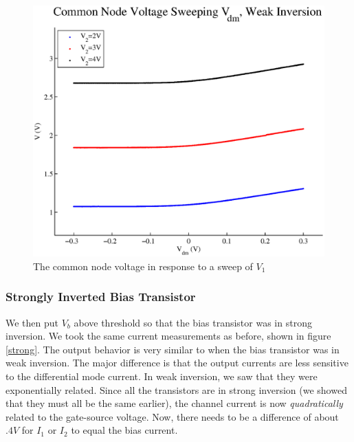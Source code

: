 \documentclass{article}
\begin{document}
\begin{figure}[H]
\centering
\includegraphics[scale=.7]{plot_weak_v.eps}
\caption{The common node voltage in response to a sweep of $V_1$}
\label{weakV}
\end{figure}

\subsubsection*{Strongly Inverted Bias Transistor}

We then put $V_b$ above threshold so that the bias transistor was in strong inversion. We took the same current measurements as before, shown in figure \ref{strong}. The output behavior is very similar to when the bias transistor was in weak inversion. The major difference is that the output currents are less sensitive to the differential mode current. In weak inversion, we saw that they were exponentially related. Since all the transistors are in strong inversion (we showed that they must all be the same earlier), the channel current is now \emph{quadratically} related to the gate-source voltage. Now, there needs to be a difference of about $.4V$ for $I_1$ or $I_2$ to equal the bias current. \\
\end{document}
